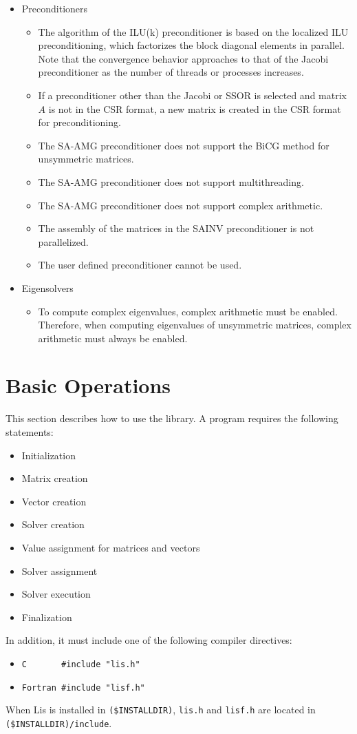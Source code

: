 \documentclass[a4paper]{article}
\begin{document}
\begin{itemize}
\item Preconditioners
\begin{itemize}
\item The algorithm of the ILU(k) preconditioner is based on the localized ILU preconditioning\cite{nakajima}, which factorizes the block diagonal elements in parallel. Note that the convergence behavior approaches to that of the Jacobi preconditioner as the number of threads or processes increases.
\item If a preconditioner other than the Jacobi or SSOR is selected 
      and matrix $A$ is not in the CSR format, a new matrix is created 
      in the CSR format for preconditioning.
\item The SA-AMG preconditioner does not support the BiCG method for unsymmetric matrices. 
\item The SA-AMG preconditioner does not support multithreading.
\item The SA-AMG preconditioner does not support complex arithmetic.   
\item The assembly of the matrices in the SAINV preconditioner is not parallelized.
\item The user defined preconditioner cannot be used.
\end{itemize}

\item Eigensolvers
\begin{itemize}
\item To compute complex eigenvalues, complex arithmetic must be enabled. Therefore, when computing eigenvalues of unsymmetric matrices, complex arithmetic must always be enabled. 
\end{itemize}

\end{itemize}
\vspace*{5mm}

\newpage
\section{Basic Operations}
This section describes how to use the library. 
A program requires the following statements:
\begin{itemize}
\item Initialization
\item Matrix creation
\item Vector creation
\item Solver creation
\item Value assignment for matrices and vectors
\item Solver assignment
\item Solver execution
\item Finalization
\end{itemize}
In addition, it must include one of the following compiler directives: 
\begin{itemize}
\item \verb+C       #include "lis.h"+
\item \verb+Fortran #include "lisf.h"+
\end{itemize}
When Lis is installed in \verb|($INSTALLDIR)|, {\tt lis.h} and {\tt lisf.h}
are located in \verb|($INSTALLDIR)/include|.
\end{document}
